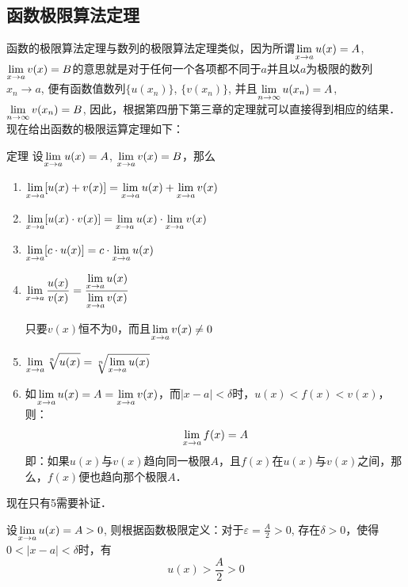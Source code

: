 \subsection{函数极限算法定理}
函数的极限算法定理与数列的极限算法定理类似，因为所谓$\displaystyle\lim_{x\to a}u(x)=A$, $\displaystyle\lim_{x\to a}v(x)=B$的意思就是对于任何一个各项都不同于$a$并且以$a$为极限的数列$x_n\to a$, 便有函数值数列$\{u(x_n)\}$, $\{v(x_n)\}$, 并且$\displaystyle\lim_{n\to \infty}u(x_n)=A$, 
$\displaystyle\lim_{n\to \infty} v(x_n)=B$, 因此，根据第四册下第三章的定理就可以直接得到相应的结果．现在给出函数的极限运算定理如下：

\begin{blk}{定理}
设$\displaystyle\lim_{x\to a}u(x)=A$, $\displaystyle\lim_{x\to a}v(x)=B$，那么
\begin{enumerate}
    \item $\displaystyle\lim_{x\to a}[u(x)+v(x)]=\displaystyle\lim_{x\to a}u(x)+\displaystyle\lim_{x\to a}v(x)$
    \item $\displaystyle\lim_{x\to a}[u(x)\cdot v(x)]=\displaystyle\lim_{x\to a} u(x)\cdot \displaystyle\lim_{x\to a}v(x)$
    \item $\displaystyle\lim_{x\to a}[c\cdot u(x)]=c\cdot \displaystyle\lim_{x\to a}u(x)$
    \item $\displaystyle\lim_{x\to a}\dfrac{u(x)}{v(x)}=\dfrac{\displaystyle\lim_{x\to a}u(x)}{\displaystyle\lim_{x\to a}v(x)}$ 
    
    只要$v(x)$恒不为0，而且$\displaystyle\lim_{x\to a}v(x)\ne 0$
    \item $\displaystyle\lim_{x\to a}\sqrt[n]{u(x)}=\sqrt[n]{\displaystyle\lim_{x\to a}u(x)}$
    \item 如$\displaystyle\lim_{x\to a}u(x)=A=\displaystyle\lim_{x\to a} v(x)$，而$|x-a|<\delta$时，$u(x)<f(x)<v(x)$，则：
    \[\displaystyle\lim_{x\to a} f(x)=A\]
    即：如果$u(x)$与$v(x)$趋向同一极限$A$，且$f(x)$在$u(x)$与$v(x)$之间，那么，$f(x)$便也趋向那个极限$A$．
\end{enumerate}
\end{blk}

现在只有5需要补证．

设$\displaystyle\lim_{x\to a}u(x)=A>0$, 则根据函数极限定义：对于$\varepsilon=\frac{A}{2}>0$, 存在$\delta>0$，使得$0<|x-a|<\delta$时，有
\begin{equation}
    u(x)>\frac{A}{2}>0
\end{equation}

